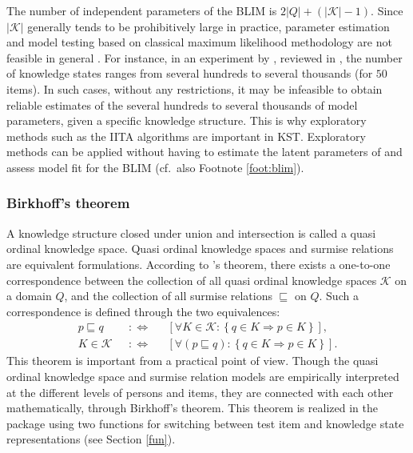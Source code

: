 \documentclass[nojss]{jss}
\begin{document}
The number of independent parameters of the BLIM is $2|Q|+(|\mathcal{K}|-1)$. Since $|\mathcal{K}|$ generally tends to be prohibitively large in practice, parameter estimation and model testing based on classical maximum likelihood methodology are not feasible in general 
\citep[for details, see][]{U:06, U:07}. 
For instance, in an experiment by \cite{Kamb:91} \citep[see also][]{KKVF:94}, 
reviewed in \cite{DF:99},
the number of knowledge states ranges from several hundreds to several thousands 
(for $50$ items). 
In such cases, without any restrictions, it may be infeasible to obtain reliable estimates of the 
several hundreds to several thousands of model parameters, given a specific knowledge structure.
This is why exploratory methods such as the IITA algorithms are important in KST. Exploratory methods can be applied without having to estimate the latent parameters of and assess model fit 
for the BLIM (cf.\ also Footnote \ref{foot:blim}).

\subsubsection{Birkhoff's theorem}
\label{subsubsec:birk}

A knowledge structure closed under union and intersection is called a quasi ordinal knowledge space. Quasi ordinal knowledge spaces and surmise relations are equivalent formulations. According to \cite{B:37}'s theorem, there exists a one-to-one correspondence between the collection of all quasi ordinal knowledge spaces $\mathcal{K}$ on a domain $Q$, and the collection of all surmise relations $\sqsubseteq$ on $Q$. Such a correspondence is defined through the two equivalences:
\begin{eqnarray*}
p\sqsubseteq q  
\,\,\,\,&:\Longleftrightarrow & \,\,\,\,
\left[\forall K\in \mathcal{K}: \left\{q\in K\Longrightarrow p\in K\right\}\right], \\
K\in \mathcal{K} 
\,\,\,\,&:\Longleftrightarrow & \,\,\,\,
\left[\forall (p\sqsubseteq q): \left\{q\in K\Longrightarrow p\in K\right\}\right].
\end{eqnarray*} 
This theorem is important from a practical point of view. Though the quasi ordinal knowledge space and surmise
relation models are empirically interpreted at the different levels of persons and items, they are connected with each other mathematically, through Birkhoff's theorem. This theorem is realized in the package  using two functions for switching between test item and knowledge state representations (see Section \ref{fun}). 
\end{document}
